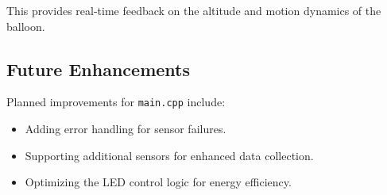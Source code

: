 \documentclass{article}
\begin{document}
This provides real-time feedback on the altitude and motion dynamics of the balloon.

\subsection{Future Enhancements}
Planned improvements for \texttt{main.cpp} include:
\begin{itemize}
    \item Adding error handling for sensor failures.
    \item Supporting additional sensors for enhanced data collection.
    \item Optimizing the LED control logic for energy efficiency.
\end{itemize}
\end{document}
